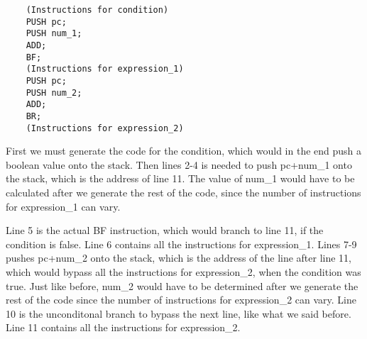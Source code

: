 \documentclass{article}
\begin{document}
\begin{lstlisting}
    (Instructions for condition)
    PUSH pc;
    PUSH num_1;
    ADD;
    BF;
    (Instructions for expression_1)
    PUSH pc;
    PUSH num_2;
    ADD;
    BR;
    (Instructions for expression_2)
\end{lstlisting}

First we must generate the code for the condition, which would in the end push a boolean value onto the stack. Then lines 2-4 is needed to push pc+num\_1 onto the stack, which is the address of line 11. The value of num\_1 would have to be calculated after we generate the rest of the code, since the number of instructions for expression\_1 can vary.

Line 5 is the actual BF instruction, which would branch to line 11, if the condition is false. Line 6 contains all the instructions for expression\_1. Lines 7-9 pushes pc+num\_2 onto the stack, which is the address of the line after line 11, which would bypass all the instructions for expression\_2, when the condition was true. Just like before, num\_2 would have to be determined after we generate the rest of the code since the number of instructions for expression\_2 can vary. Line 10 is the unconditonal branch to bypass the next line, like what we said before. Line 11 contains all the instructions for expression\_2.
\end{document}
